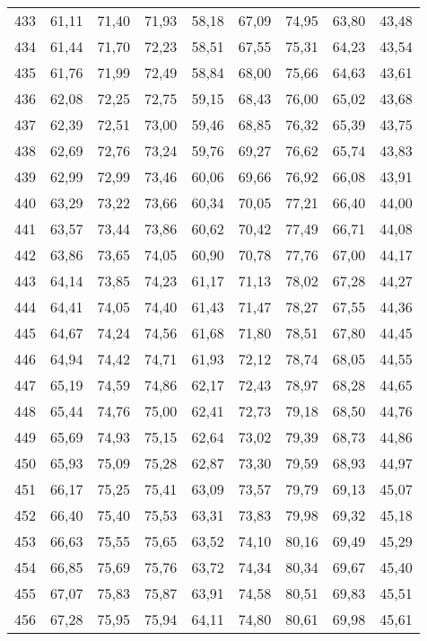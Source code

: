 \begin{longtable}{c c c c c c c c c}
433	& 61,11	& 71,40	& 71,93	& 58,18	& 67,09	& 74,95	& 63,80	& 43,48 \\
434	& 61,44	& 71,70	& 72,23	& 58,51	& 67,55	& 75,31	& 64,23	& 43,54 \\
435	& 61,76	& 71,99	& 72,49	& 58,84	& 68,00	& 75,66	& 64,63	& 43,61 \\
436	& 62,08	& 72,25	& 72,75	& 59,15	& 68,43	& 76,00	& 65,02	& 43,68 \\
437	& 62,39	& 72,51	& 73,00	& 59,46	& 68,85	& 76,32	& 65,39	& 43,75 \\
438	& 62,69	& 72,76	& 73,24	& 59,76	& 69,27	& 76,62	& 65,74	& 43,83 \\
439	& 62,99	& 72,99	& 73,46	& 60,06	& 69,66	& 76,92	& 66,08	& 43,91 \\
440	& 63,29	& 73,22	& 73,66	& 60,34	& 70,05	& 77,21	& 66,40	& 44,00 \\
441	& 63,57	& 73,44	& 73,86	& 60,62	& 70,42	& 77,49	& 66,71	& 44,08 \\
442	& 63,86	& 73,65	& 74,05	& 60,90	& 70,78	& 77,76	& 67,00	& 44,17 \\
443	& 64,14	& 73,85	& 74,23	& 61,17	& 71,13	& 78,02	& 67,28	& 44,27 \\
444	& 64,41	& 74,05	& 74,40	& 61,43	& 71,47	& 78,27	& 67,55	& 44,36 \\
445	& 64,67	& 74,24	& 74,56	& 61,68	& 71,80	& 78,51	& 67,80	& 44,45 \\
446	& 64,94	& 74,42	& 74,71	& 61,93	& 72,12	& 78,74	& 68,05	& 44,55 \\
447	& 65,19	& 74,59	& 74,86	& 62,17	& 72,43	& 78,97	& 68,28	& 44,65 \\
448	& 65,44	& 74,76	& 75,00	& 62,41	& 72,73	& 79,18	& 68,50	& 44,76 \\
449	& 65,69	& 74,93	& 75,15	& 62,64	& 73,02	& 79,39	& 68,73	& 44,86 \\
450	& 65,93	& 75,09	& 75,28	& 62,87	& 73,30	& 79,59	& 68,93	& 44,97 \\
451	& 66,17	& 75,25	& 75,41	& 63,09	& 73,57	& 79,79	& 69,13	& 45,07 \\
452	& 66,40	& 75,40	& 75,53	& 63,31	& 73,83	& 79,98	& 69,32	& 45,18 \\
453	& 66,63	& 75,55	& 75,65	& 63,52	& 74,10	& 80,16	& 69,49	& 45,29 \\
454	& 66,85	& 75,69	& 75,76	& 63,72	& 74,34	& 80,34	& 69,67	& 45,40 \\
455	& 67,07	& 75,83	& 75,87	& 63,91	& 74,58	& 80,51	& 69,83	& 45,51 \\
456	& 67,28	& 75,95	& 75,94	& 64,11	& 74,80	& 80,61	& 69,98	& 45,61 \\

\end{longtable}
